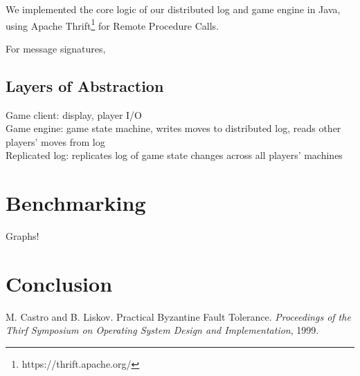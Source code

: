 \documentclass[11pt]{article}
\begin{document}
\begin{multicols}{2}
We implemented the core logic of our distributed log and game engine in Java, using Apache Thrift\footnote{https://thrift.apache.org/} for Remote Procedure Calls.

For message signatures, 

\subsection{Layers of Abstraction}

Game client: display, player I/O  \\
Game engine: game state machine, writes moves to distributed log, reads other players' moves from log \\
Replicated log: replicates log of game state changes across all players' machines

\section{Benchmarking}

Graphs!



\section{Conclusion}

\begin{thebibliography}{9}

 M. Castro and B. Liskov. Practical Byzantine Fault Tolerance. \emph{Proceedings of the Thirf Symposium on Operating System Design and Implementation}, 1999.

\end{thebibliography}



\end{multicols}
\end{document}
